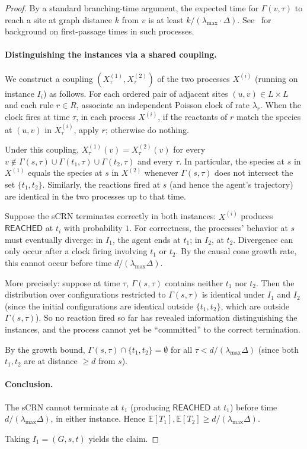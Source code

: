 \documentclass[11pt]{article}
\theoremstyle{plain}
\theoremstyle{definition}
\theoremstyle{remark}
\begin{document}
\begin{proof}
By a standard branching-time argument, the expected time for $\Gamma(v, \tau)$ to reach a site at graph distance $k$ from $v$ is at least $k / (\lambda_{\max} \cdot \Delta)$. See~\cite[Ch.~VII]{feller1971} for background on first-passage times in such processes.

\paragraph{Distinguishing the instances via a shared coupling.} We construct a coupling $(X^{(1)}_\tau, X^{(2)}_\tau)$ of the two processes $X^{(i)}$ (running on instance $I_i$) as follows. For each ordered pair of adjacent sites $(u, v) \in L \times L$ and each rule $r \in R$, associate an independent Poisson clock of rate $\lambda_r$. When the clock fires at time $\tau$, in each process $X^{(i)}$, if the reactants of $r$ match the species at $(u, v)$ in $X^{(i)}_\tau$, apply $r$; otherwise do nothing.

Under this coupling, $X^{(1)}_\tau(v) = X^{(2)}_\tau(v)$ for every $v \notin \Gamma(s, \tau) \cup \Gamma(t_1, \tau) \cup \Gamma(t_2, \tau)$ and every $\tau$. In particular, the species at $s$ in $X^{(1)}$ equals the species at $s$ in $X^{(2)}$ whenever $\Gamma(s, \tau)$ does not intersect the set $\{t_1, t_2\}$. Similarly, the reactions fired at $s$ (and hence the agent's trajectory) are identical in the two processes up to that time.

Suppose the sCRN terminates correctly in both instances: $X^{(i)}$ produces $\mathsf{REACHED}$ at $t_i$ with probability $1$. For correctness, the processes' behavior at $s$ must eventually diverge: in $I_1$, the agent ends at $t_1$; in $I_2$, at $t_2$. Divergence can only occur after a clock firing involving $t_1$ or $t_2$. By the causal cone growth rate, this cannot occur before time $d / (\lambda_{\max} \Delta)$.

More precisely: suppose at time $\tau$, $\Gamma(s, \tau)$ contains neither $t_1$ nor $t_2$. Then the distribution over configurations restricted to $\Gamma(s, \tau)$ is identical under $I_1$ and $I_2$ (since the initial configurations are identical outside $\{t_1, t_2\}$, which are outside $\Gamma(s, \tau)$). So no reaction fired so far has revealed information distinguishing the instances, and the process cannot yet be ``committed'' to the correct termination.

By the growth bound, $\Gamma(s, \tau) \cap \{t_1, t_2\} = \emptyset$ for all $\tau < d / (\lambda_{\max} \Delta)$ (since both $t_1, t_2$ are at distance $\geq d$ from $s$).

\paragraph{Conclusion.} The sCRN cannot terminate at $t_1$ (producing $\mathsf{REACHED}$ at $t_1$) before time $d / (\lambda_{\max} \Delta)$, in either instance. Hence $\mathbb{E}[T_1], \mathbb{E}[T_2] \geq d / (\lambda_{\max} \Delta)$.

Taking $I_1 = (G, s, t)$ yields the claim.
\end{proof}
\end{document}

